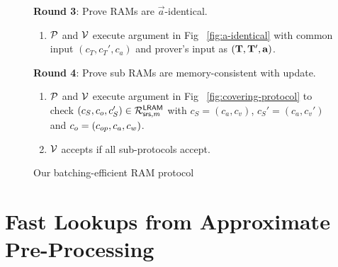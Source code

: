 \begin{figure}[t!]
\begin{mdframed}
        {\bf Round 3}: Prove RAMs are $\vec{a}$-identical.
        \begin{enumerate}[leftmargin=1em, label=\arabic*.]
            \item $\mathcal{P}$ and $\mathcal{V}$ execute argument in Fig ~\ref{fig:a-identical} with common input
            $(c_T,c_T',c_a)$ and prover's input as $(\mathbf{T},\mathbf{T}',\mathbf{a})$.
        \end{enumerate}

        {\bf Round 4}: Prove sub RAMs are memory-consistent with update.
        \begin{enumerate}[leftmargin=1em, label=\arabic*.]
        \item $\mathcal{P}$ and $\mathcal{V}$ execute argument in Fig ~\ref{fig:covering-protocol}
        to check $(c_S, c_o, c_S')\in \mathcal{R}^{\mathsf{LRAM}}_{\mathsf{srs},m}$ with $c_S = (c_a, c_v)$, $c_S'=(c_a, c_v')$ and
        $c_o=(c_{op},c_a,c_w)$.
        \item $\mathcal{V}$ accepts if all sub-protocols accept.
        \end{enumerate}
    \end{mdframed}
    \caption{Our batching-efficient RAM protocol}
    \label{fig:complete-listing}
\end{figure}

\section{Fast Lookups from Approximate Pre-Processing}\label{sec:update-protocol}

